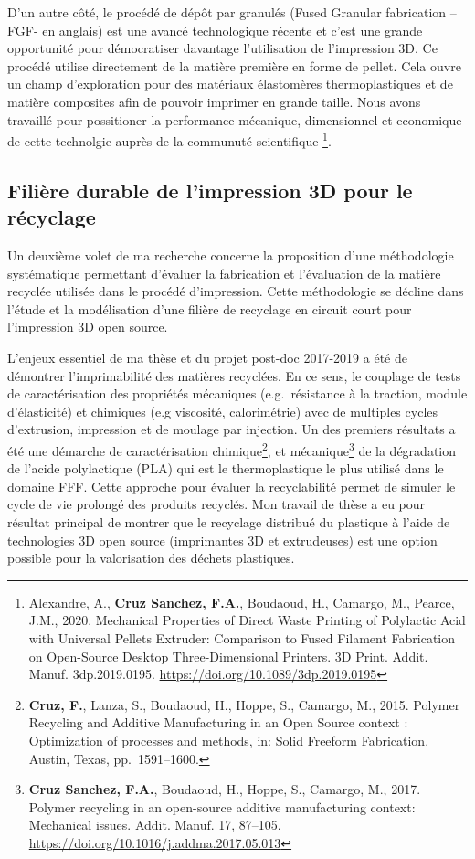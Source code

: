 \documentclass[
  12pt,
  oneside]{book}
\begin{document}
D'un autre côté, le procédé de dépôt par granulés (Fused Granular fabrication --FGF- en anglais) est une avancé technologique récente et c'est une grande opportunité pour démocratiser davantage l'utilisation de l'impression 3D.
Ce procédé utilise directement de la matière première en forme de pellet.
Cela ouvre un champ d'exploration pour des matériaux élastomères thermoplastiques et de matière composites afin de pouvoir imprimer en grande taille.
Nous avons travaillé pour possitioner la performance mécanique, dimensionnel et economique de cette technolgie auprès de la communuté scientifique \footnote{Alexandre, A., \textbf{Cruz Sanchez, F.A.}, Boudaoud, H., Camargo, M., Pearce, J.M., 2020. Mechanical Properties of Direct Waste Printing of Polylactic Acid with Universal Pellets Extruder: Comparison to Fused Filament Fabrication on Open-Source Desktop Three-Dimensional Printers. 3D Print. Addit. Manuf. 3dp.2019.0195. \url{https://doi.org/10.1089/3dp.2019.0195}}.

\hypertarget{filiuxe8re-durable-de-limpression-3d-pour-le-ruxe9cyclage}{%
\subsection{Filière durable de l'impression 3D pour le récyclage}\label{filiuxe8re-durable-de-limpression-3d-pour-le-ruxe9cyclage}}

Un deuxième volet de ma recherche concerne la proposition d'une méthodologie systématique permettant d'évaluer la fabrication et l'évaluation de la matière recyclée utilisée dans le procédé d'impression.
Cette méthodologie se décline dans l'étude et la modélisation d'une filière de recyclage en circuit court pour l'impression 3D open source.

L'enjeux essentiel de ma thèse et du projet post-doc 2017-2019 a été de démontrer l'imprimabilité des matières recyclées. En ce sens, le couplage de tests de caractérisation des propriétés mécaniques (e.g.~résistance à la traction, module d'élasticité) et chimiques (e.g viscosité, calorimétrie) avec de multiples cycles d'extrusion, impression et de moulage par injection.
Un des premiers résultats a été une démarche de caractérisation chimique\footnote{\textbf{Cruz, F.}, Lanza, S., Boudaoud, H., Hoppe, S., Camargo, M., 2015. Polymer Recycling and Additive Manufacturing in an Open Source context : Optimization of processes and methods, in: Solid Freeform Fabrication. Austin, Texas, pp.~1591--1600.}, et mécanique\footnote{\textbf{Cruz Sanchez, F.A.}, Boudaoud, H., Hoppe, S., Camargo, M., 2017. Polymer recycling in an open-source additive manufacturing context: Mechanical issues. Addit. Manuf. 17, 87--105. \url{https://doi.org/10.1016/j.addma.2017.05.013}} de la dégradation de l'acide polylactique (PLA) qui est le thermoplastique le plus utilisé dans le domaine FFF.
Cette approche pour évaluer la recyclabilité permet de simuler le cycle de vie prolongé des produits recyclés.
Mon travail de thèse a eu pour résultat principal de montrer que le recyclage distribué du plastique à l'aide de technologies 3D open source (imprimantes 3D et extrudeuses) est une option possible pour la valorisation des déchets plastiques.
\end{document}
